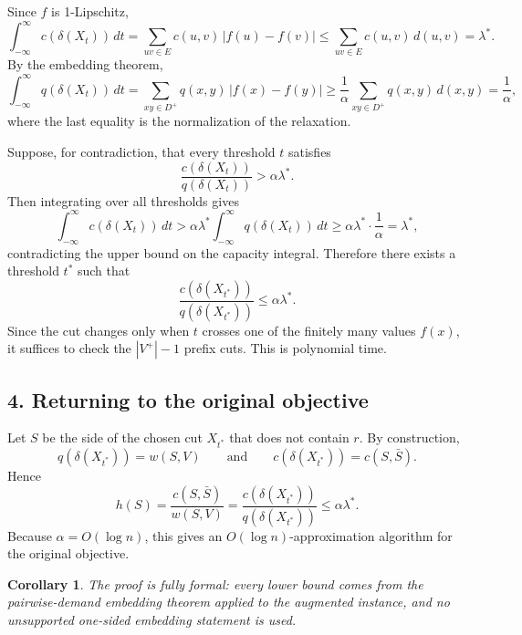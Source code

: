 \documentclass[11pt]{article}
\newtheorem{corollary}{Corollary}
\newcommand{\br}[1]{\left(#1\right)}
\newcommand{\cut}{\delta}
\begin{document}
Since $f$ is 1-Lipschitz,
\[
\int_{-\infty}^{\infty} c\br{\cut\br{X_t}}\,dt
= 
\sum_{uv\in E} c\br{u,v}\,|f\br{u}-f\br{v}|
\le
\sum_{uv\in E} c\br{u,v}\,d\br{u,v}
= \lambda^*.
\]
By the embedding theorem,
\[
\int_{-\infty}^{\infty} q\br{\cut\br{X_t}}\,dt
=
\sum_{xy\in D^+} q\br{x,y}\,|f\br{x}-f\br{y}|
\ge
\frac{1}{\alpha}
\sum_{xy\in D^+} q\br{x,y}\,d\br{x,y}
=
\frac{1}{\alpha},
\]
where the last equality is the normalization of the relaxation.

Suppose, for contradiction, that every threshold $t$ satisfies
\[
\frac{c\br{\cut\br{X_t}}}{q\br{\cut\br{X_t}}} > \alpha\lambda^*.
\]
Then integrating over all thresholds gives
\[
\int_{-\infty}^{\infty} c\br{\cut\br{X_t}}\,dt
>
\alpha\lambda^*
\int_{-\infty}^{\infty} q\br{\cut\br{X_t}}\,dt
\ge
\alpha\lambda^*\cdot \frac{1}{\alpha}
=
\lambda^*,
\]
contradicting the upper bound on the capacity integral. Therefore there exists a threshold $t^*$ such that
\[
\frac{c\br{\cut\br{X_{t^*}}}}{q\br{\cut\br{X_{t^*}}}}
\le
\alpha\lambda^*.
\]
Since the cut changes only when $t$ crosses one of the finitely many values $f\br{x}$, it suffices to check the $|V^+|-1$ prefix cuts. This is polynomial time.

\subsection*{4. Returning to the original objective}

Let $S$ be the side of the chosen cut $X_{t^*}$ that does not contain $r$. By construction,
\[
q\br{\cut\br{X_{t^*}}}=w\br{S,V}
\qquad\text{and}\qquad
c\br{\cut\br{X_{t^*}}}=c\br{S,\bar S}.
\]
Hence
\[
 h\br{S}=
\frac{c\br{S,\bar S}}{w\br{S,V}}
=
\frac{c\br{\cut\br{X_{t^*}}}}{q\br{\cut\br{X_{t^*}}}}
\le
\alpha\lambda^*.
\]
Because $\alpha=O\br{\log n}$, this gives an $O\br{\log n}$-approximation algorithm for the original objective.

\begin{corollary}
The proof is fully formal: every lower bound comes from the pairwise-demand embedding theorem applied to the augmented instance, and no unsupported one-sided embedding statement is used.
\end{corollary}
\end{document}

